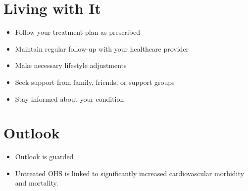 \section{Living with It}
\begin{itemize}[noitemsep]
  \item Follow your treatment plan as prescribed
  \item Maintain regular follow-up with your healthcare provider
  \item Make necessary lifestyle adjustments
  \item Seek support from family, friends, or support groups
  \item Stay informed about your condition
\end{itemize}
\section{Outlook}
\begin{itemize}[noitemsep]
  \item Outlook is guarded
  \item Untreated OHS is linked to significantly increased cardiovascular morbidity and mortality.
\end{itemize}
